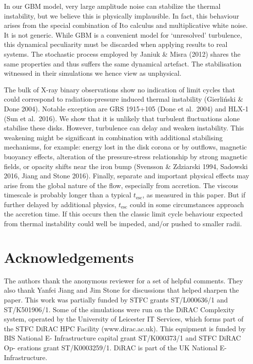 \documentclass[useAMS]{mn2e}
\begin{document}
In our GBM model, very large 
amplitude noise can stabilize the thermal instability, but we 
believe this is physically implausible. In fact, this behaviour
arises from the special combination of Ito calculus and multiplicative white
noise. It is not generic. 
While GBM is a convenient model for
 `unresolved' turbulence, this dynamical peculiarity must be discarded when
applying results to real systems. The stochastic process
employed by Janiuk \& Misra (2012) shares the same properties and thus
suffers
the same dynamical artefact. The stabilisation witnessed in their
simulations we hence view as unphysical.

 
The bulk of X-ray binary observations show no indication of limit
cycles that could correspond to radiation-pressure induced 
thermal instability
(Gierli\'{n}ski \& Done 2004). Notable exception are GRS 1915+105
(Done et al.~2004) and HLX-1 (Sun et al.~2016). We show that it is
unlikely that
turbulent fluctuations alone stabilise these disks. 
However, turbulence can delay and weaken instability.
This weakening might be
significant
in combination with additional
stabilising mechanisms, for example: energy lost in the disk corona or by outflows,
magnetic buoyancy effects, alteration of the pressure-stress
relationship by strong magnetic fields, or opacity shifts near the
iron bump (Svensson \& Zdziarski 1994, Sadowski 2016, Jiang and Stone
2016). Finally, separate and important physical effects may arise from the
global nature of the flow, especially from accretion. The viscous timescale
is probably longer than a typical $t_{\text{esc}}$, as measured in this
paper. But if further delayed by additional physics, $t_{\text{esc}}$ 
could in some circumstances 
approach the
accretion time. If this occurs then the classic limit cycle behaviour expected
from thermal instability could well be impeded, and/or pushed to smaller
radii.

\section*{Acknowledgements}
The authors thank the anonymous reviewer for
a set of helpful comments. They also thank Yanfei Jiang
and Jim Stone for discussions that helped sharpen the paper.
This work was partially funded by STFC
grants ST/L000636/1 and ST/K501906/1.
Some of the simulations were run on the
DiRAC Complexity system, operated by the University of Leicester
IT Services, which forms part of the STFC DiRAC HPC Facility
(www.dirac.ac.uk). This equipment is funded by BIS National E-
Infrastructure capital grant ST/K000373/1 and STFC DiRAC Op-
erations grant ST/K0003259/1. DiRAC is part of the UK National
E-Infrastructure.
\end{document}
